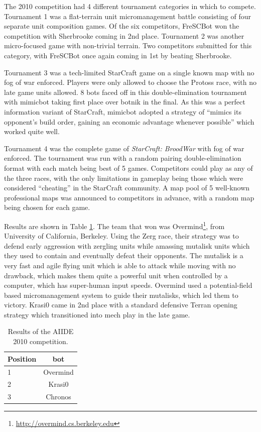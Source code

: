 \documentclass[journal]{IEEEtran}
\begin{document}
The 2010 competition had 4 different tournament categories in which to compete. Tournament 1
was a flat-terrain unit micromanagement battle consisting of four separate unit
composition games. Of the six competitors, FreSCBot won the competition with
Sherbrooke coming in 2nd place. Tournament 2 was another micro-focused game with
non-trivial terrain. Two competitors submitted for this category, with FreSCBot
once again coming in 1st by beating Sherbrooke.

Tournament 3 was a tech-limited StarCraft game on a single known map with no fog of war enforced. Players
were only allowed to choose the Protoss race, with no late game units allowed. 8 bots
faced off in this double-elimination tournament with mimicbot taking first place over botnik in the final.
As this was a perfect information variant of StarCraft, mimicbot adopted a strategy of
``mimics its opponent's build order, gaining an economic advantage whenever possible'' which
worked quite well.

Tournament 4 was the complete game of {\em StarCraft: BroodWar} with fog of war enforced. The tournament
was run with a random pairing double-elimination format with each match being best of 5 games.
Competitors could play as any of the three races, with the only limitations in gameplay
being those which were considered ``cheating'' in the StarCraft community. A map pool of
5 well-known professional maps was announced to competitors in advance, with a random map being chosen for each game.

Results are shown in Table \ref{tab:aiide2010}. The team that won was Overmind\footnote{\url{http://overmind.cs.berkeley.edu}}, from University of California, Berkeley. Using the Zerg race, their
strategy was to defend early aggression with zergling units while amassing mutalisk units
which they used to contain and eventually defeat their opponents. The mutalisk is a very fast and agile
flying unit which is able to attack while moving with no drawback, which makes them quite a powerful
unit when controlled by a computer, which has super-human input speeds. Overmind used a potential-field
based micromanagement system to guide their mutalisks, which led them to victory. Krasi0 came in 2nd place
with a standard defensive Terran opening strategy which transitioned into mech play in the late game.


\begin{table}[t!]
\caption{Results of the AIIDE 2010 competition.}
\label{tab:aiide2010}
\begin{small}
\begin{center}
\begin{tabular}{|l|c|}
\hline
Position & bot\\ \hline
1 & Overmind \\
2 & Krasi0 \\
3 & Chronos \\ \hline
\end{tabular}
\end{center}
\end{small}
\end{table}
\end{document}
